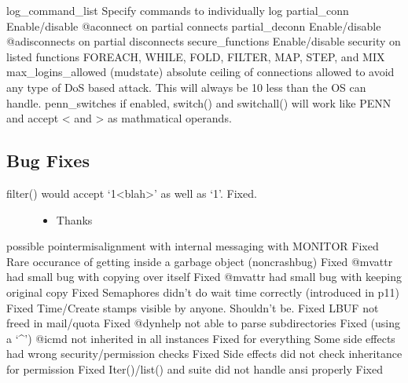 \documentclass[letterpaper,10pt,english]{sphinxmanual}
\begin{document}
\sphinxAtStartPar
log\_command\_list  \sphinxhyphen{} Specify commands to individually log
partial\_conn      \sphinxhyphen{} Enable/disable @aconnect on partial connects
partial\_deconn    \sphinxhyphen{} Enable/disable @adisconnects on partial disconnects
secure\_functions  \sphinxhyphen{} Enable/disable security on listed functions FOREACH, WHILE, FOLD, FILTER, MAP, STEP, and MIX
max\_logins\_allowed (mudstate) \sphinxhyphen{} absolute ceiling of connections allowed to avoid any type of DoS based attack.  This will always be 10 less than the OS can handle.
penn\_switches     \sphinxhyphen{} if enabled, switch() and switchall() will work like PENN and accept \textless{} and \textgreater{} as mathmatical operands.


\subsection{Bug Fixes}
\label{\detokenize{changelog:id39}}\begin{description}
\item[{filter() would accept ‘1\textless{}blah\textgreater{}’ as well as ‘1’.  \sphinxhyphen{} Fixed.}] \leavevmode\begin{itemize}
\item {} 
\sphinxAtStartPar
Thanks 

\end{itemize}

\end{description}

\sphinxAtStartPar
possible pointer\sphinxhyphen{}misalignment with internal messaging with MONITOR \sphinxhyphen{} Fixed
Rare occurance of getting inside a garbage object (non\sphinxhyphen{}crash\sphinxhyphen{}bug) \sphinxhyphen{} Fixed
@mvattr had small bug with copying over itself \sphinxhyphen{} Fixed
@mvattr had small bug with keeping original copy \sphinxhyphen{} Fixed
Semaphores didn’t do wait time correctly (introduced in p11) \sphinxhyphen{} Fixed
Time/Create stamps visible by anyone. Shouldn’t be. \sphinxhyphen{} Fixed
LBUF not freed in mail/quota \sphinxhyphen{} Fixed
@dynhelp not able to parse subdirectories \sphinxhyphen{} Fixed (using a ‘\textasciicircum{}’)
@icmd not inherited in all instances \sphinxhyphen{} Fixed for everything
Some side effects had wrong security/permission checks \sphinxhyphen{} Fixed
Side effects did not check inheritance for permission \sphinxhyphen{} Fixed
Iter()/list() and suite did not handle ansi properly \sphinxhyphen{} Fixed
\end{document}

